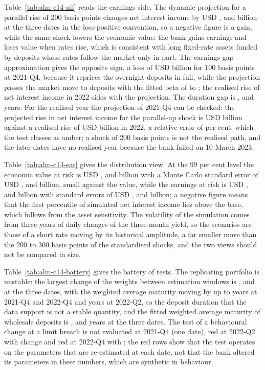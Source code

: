 Table~\ref{tab:alm-c14-nii} reads the earnings side. The dynamic projection for a parallel rise of 200 basis points changes net interest income by USD \almCDynUpA{}, \almCDynUpB{} and \almCDynUpC{} billion at the three dates in the loss-positive convention, so a negative figure is a gain, while the same shock lowers the economic value: the bank gains earnings and loses value when rates rise, which is consistent with long fixed-rate assets funded by deposits whose rates follow the market only in part. The earnings-gap approximation gives the opposite sign, a loss of USD \almCGapUpA{} billion for 100 basis points at 2021-Q4, because it reprices the overnight deposits in full, while the projection passes the market move to deposits with the fitted beta of \almCBetaA{} to \almCBetaC{}; the realised rise of net interest income in 2022 sides with the projection. The duration gap is \almCDurationGapA{}, \almCDurationGapB{} and \almCDurationGapC{} years. For the realised year the projection of 2021-Q4 can be checked: the projected rise in net interest income for the parallel-up shock is USD \almCOosProjected{} billion against a realised rise of USD \almCOosRealised{} billion in 2022, a relative error of \almCOosError{} per cent, which the test classes as amber; a shock of 200 basis points is not the realised path, and the later dates have no realised year because the bank failed on 10 March 2023.

Table~\ref{tab:alm-c14-ear} gives the distribution view. At the 99 per cent level the economic value at risk is USD \almCEvarA{}, \almCEvarB{} and \almCEvarC{} billion with a Monte Carlo standard error of USD \almCEvarSeA{}, \almCEvarSeB{} and \almCEvarSeC{} billion, small against the value, while the earnings at risk is USD \almCEarA{}, \almCEarB{} and \almCEarC{} billion with standard errors of USD \almCEarSeA{}, \almCEarSeB{} and \almCEarSeC{} billion; a negative figure means that the first percentile of simulated net interest income lies above the base, which follows from the asset sensitivity. The volatility of the simulation comes from three years of daily changes of the three-month yield, so the scenarios are those of a short rate moving by its historical amplitude, a far smaller move than the 200 to 300 basis points of the standardised shocks, and the two views should not be compared in size.

Table~\ref{tab:alm-c14-battery} gives the battery of tests. The replicating portfolio is unstable: the largest change of the weights between estimation windows is \almCStabA{}, \almCStabB{} and \almCStabC{} at the three dates, with the weighted average maturity moving by up to \almCStabWamA{} years at 2021-Q4 and 2022-Q4 and \almCStabWamB{} years at 2022-Q2, so the deposit duration that the data support is not a stable quantity, and the fitted weighted average maturity of wholesale deposits is \almCWamA{}, \almCWamB{} and \almCWamC{} years at the three dates. The test of a behavioural change at a limit breach is not evaluated at 2021-Q4 (one date), red at 2022-Q2 with \almCBreachesB{} change and red at 2022-Q4 with \almCBreachesC{}; the red rows show that the test operates on the parameters that are re-estimated at each date, not that the bank altered its parameters in these numbers, which are synthetic in behaviour.
